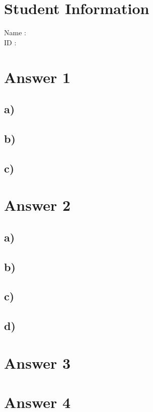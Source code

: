 \documentclass[12pt]{article}
\begin{document}
\section*{Student Information}

Name : \\

ID : \\


\section*{Answer 1}
\subsection*{a)}
\subsection*{b)}
\subsection*{c)}

\section*{Answer 2}
\subsection*{a)}
\subsection*{b)}
\subsection*{c)}
\subsection*{d)}


\section*{Answer 3}

\section*{Answer 4}
\end{document}
